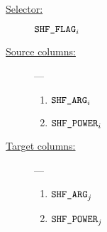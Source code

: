 \begin{description}
	\item[\underline{Selector:}] $\texttt{SHF\_FLAG} _{i}$
	\item[\underline{Source columns:}] ---
		\begin{multicols}{2}
			\begin{enumerate}
				\item $\texttt{SHF\_ARG} _{i}$
				\item $\texttt{SHF\_POWER} _{i}$
			\end{enumerate}
		\end{multicols}
	\item[\underline{Target columns:}] ---
		\begin{multicols}{2}
			\begin{enumerate}
				\item $\texttt{SHF\_ARG} _{j}$
				\item $\texttt{SHF\_POWER} _{j}$
			\end{enumerate}
		\end{multicols}
\end{description}
